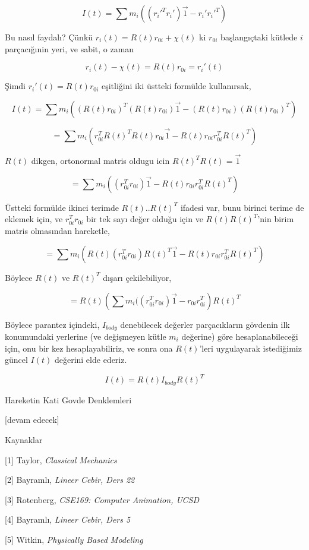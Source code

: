 \documentclass[12pt,fleqn]{article}\usepackage{../../common}
\begin{document}
$$
I(t) = \sum m_i ((r_i'^T r_i') \vec{1} - r_i' r_i'^T)
$$

Bu nasıl faydalı? Çünkü $r_i(t) = R(t) r_{0i} + \chi(t)$ ki $r_{0i}$ başlangıçtaki
kütlede $i$ parçacığınin yeri, ve sabit, o zaman

$$
r_i(t) - \chi(t) = R(t) r_{0i} = r_i'(t)
$$

Şimdi $r_i'(t) = R(t) r_{0i}$ eşitliğini iki üstteki formülde kullanırsak,

$$
I(t) = \sum
m_i ( (R(t) r_{0i})^T  (R(t) r_{0i})  \vec{1} -  (R(t) r_{0i})  (R(t) r_{0i})^T  )
$$

$$
= \sum
m_i ( r_{0i}^T R(t)^T R(t) r_{0i} \vec{1} -  R(t) r_{0i} r_{0i}^T R(t)^T )
$$

$R(t)$ dikgen, ortonormal matris oldugu icin $R(t)^TR(t) = \vec{1}$

$$
= \sum
m_i ( (r_{0i}^T r_{0i}) \vec{1} -  R(t) r_{0i} r_{0i}^T R(t)^T )
$$


Üstteki formülde ikinci terimde $R(t) .. R(t)^T$ ifadesi var, bunu
birinci terime de eklemek için, ve $r_{0i}^T r_{0i}$ bir tek sayı değer
olduğu için ve $R(t) R(t)^T$'nin birim matris olmasından hareketle,

$$
= \sum
m_i ( R(t) (r_{0i}^T r_{0i}) R(t)^T \vec{1} -  R(t) r_{0i} r_{0i}^T R(t)^T )
$$

Böylece $R(t)$ ve $R(t)^T$ dışarı çekilebiliyor,

$$
= R(t) \left( \sum 
m_i (( r_{0i}^T r_{0i}) \vec{1} -  r_{0i} r_{0i}^T
\right)  R(t)^T 
$$

Böylece parantez içindeki, $I_{body}$ denebilecek değerler parçacıkların
gövdenin ilk konumundaki yerlerine (ve değişmeyen kütle $m_i$ değerine) göre
hesaplanabileceği için, onu bir kez hesaplayabiliriz, ve sonra ona $R(t)$'leri
uygulayarak istediğimiz güncel $I(t)$ değerini elde ederiz.

$$
I(t) = R(t) I_{body} R(t)^T
$$

Hareketin Kati Govde Denklemleri






[devam edecek]

Kaynaklar

[1] Taylor, {\em Classical Mechanics}

[2] Bayramlı, {\em Lineer Cebir, Ders 22}

[3] Rotenberg, {\em CSE169: Computer Animation, UCSD}

[4] Bayramlı, {\em Lineer Cebir, Ders 5}

[5] Witkin, {\em Physically Based Modeling}
\end{document}
